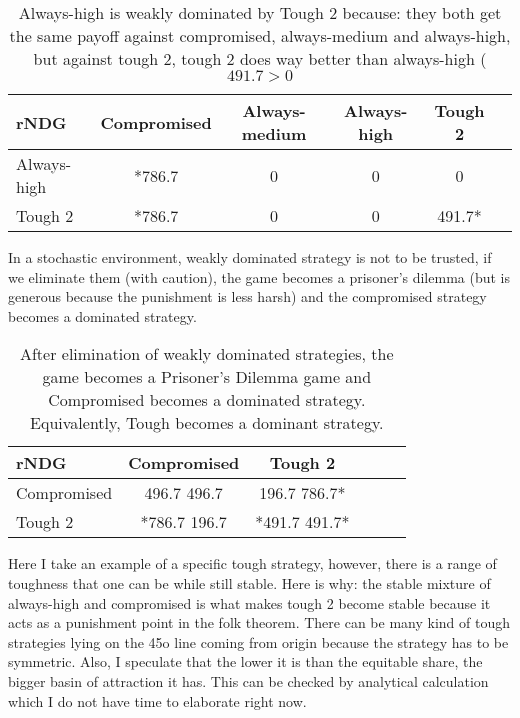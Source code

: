 \documentclass[12.5pt]{report}
\begin{document}
\begin{table}
\center
\begin{tabular}{l|ccccc}
\textbf{rNDG}&Compromised& Always-medium & Always-high & Tough 2\\
\hline
Always-high &  *786.7   &    0      &        0     &        0      \\
Tough 2 & *786.7  &       0     &        0    & 491.7*\\
\end{tabular}
\caption{Always-high is weakly dominated by Tough 2 because: they both get the same payoff against compromised, always-medium and always-high, but against tough 2, tough 2 does way better than always-high ($491.7 > 0$}
\end{table}

In a stochastic environment, weakly dominated strategy is not to be trusted, if we eliminate them (with caution), the game becomes a prisoner's dilemma (but is generous because the punishment is less harsh) and the compromised strategy becomes a dominated strategy.

\begin{table}
\center
\begin{tabular}{l|ccccc}
\textbf{rNDG}&Compromised&  Tough 2\\
\hline
Compromised & 496.7 496.7 &    196.7 786.7* \\
Tough 2 & *786.7 196.7  &       *491.7 491.7*\\
\end{tabular}
\caption{After elimination of weakly dominated strategies, the game becomes a Prisoner's Dilemma game and Compromised becomes a dominated strategy. Equivalently, Tough becomes a dominant strategy.}
\end{table}

Here I take an example of a specific tough strategy, however, there is a range of toughness that one can be while still stable. Here is why: the stable mixture of always-high and compromised is what makes tough 2 become stable because it acts as a punishment point in the folk theorem. There can be many kind of tough strategies lying on the 45o line coming from origin because the strategy has to be symmetric. Also, I speculate that the lower it is than the equitable share, the bigger basin of attraction it has. This can be checked by analytical calculation which I do not have time to elaborate right now.
\end{document}
